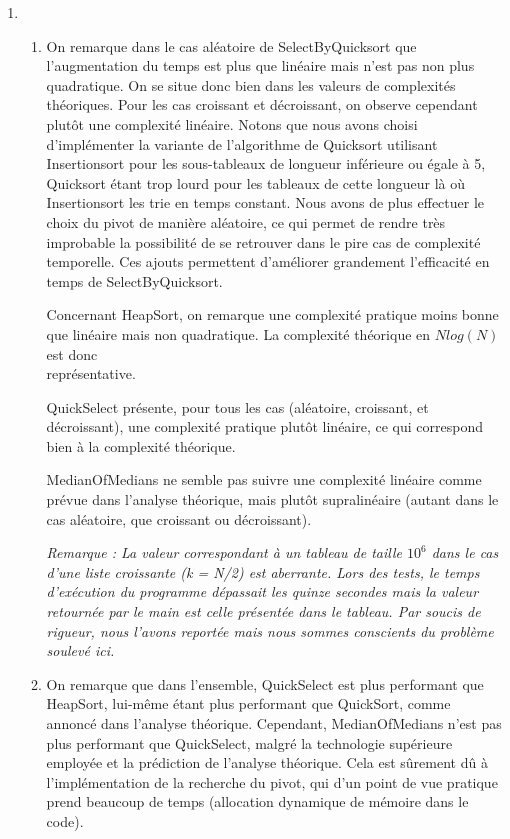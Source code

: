 \documentclass[a4paper, 11pt]{article}
\begin{document}
\begin{enumerate}
\item
    \begin{enumerate}
    \item 
    \qquad On remarque dans le cas aléatoire de SelectByQuicksort que l'augmentation du temps est plus que linéaire mais n'est pas non plus quadratique. On se situe donc bien dans les valeurs de complexités théoriques. Pour les cas croissant et décroissant, on observe cependant plutôt une complexité linéaire. Notons que nous avons choisi d'implémenter la variante de l'algorithme de Quicksort utilisant Insertionsort pour les sous-tableaux de longueur inférieure ou égale à 5, Quicksort étant trop lourd pour les tableaux de cette longueur là où Insertionsort les trie en temps constant. Nous avons de plus effectuer le choix du pivot de manière aléatoire, ce qui permet de rendre très improbable la possibilité de se retrouver dans le pire cas de complexité temporelle. Ces ajouts permettent d'améliorer grandement l'efficacité en temps de SelectByQuicksort. 
    
    \qquad Concernant HeapSort, on remarque une complexité pratique moins bonne que linéaire mais non quadratique. La complexité théorique en $Nlog(N)$ est donc \\représentative.
    
    \qquad QuickSelect présente, pour tous les cas (aléatoire, croissant, et décroissant), une complexité pratique plutôt linéaire, ce qui correspond bien à la complexité théorique.
    
    \qquad MedianOfMedians ne semble pas suivre une complexité linéaire comme prévue dans l'analyse théorique, mais plutôt supralinéaire (autant dans le cas aléatoire, que croissant ou décroissant).
    
    \itshape Remarque : La valeur correspondant à un tableau de taille $10^6$ dans le cas d'une liste croissante (k = N/2) est aberrante. Lors des tests, le temps d'exécution du programme dépassait les quinze secondes mais la valeur retournée par le main est celle présentée dans le tableau. Par soucis de rigueur, nous l'avons reportée mais nous sommes conscients du problème soulevé ici.
    \normalfont
    \item
    \qquad On remarque que dans l'ensemble, QuickSelect est plus performant que HeapSort, lui-même étant plus performant que QuickSort, comme annoncé dans l'analyse théorique. Cependant, MedianOfMedians n'est pas plus performant que QuickSelect, malgré la technologie supérieure employée et la prédiction de l'analyse théorique. Cela est sûrement dû à l'implémentation de la recherche du pivot, qui d'un point de vue pratique prend beaucoup de temps (allocation dynamique de mémoire dans le code).
    

\end{enumerate}
\end{enumerate}
\end{document}
